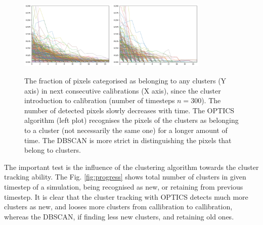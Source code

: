 \begin{figure}[H]
\centering
\includegraphics[width=0.4\textwidth]{figures/chapter4/velopix_clusters/optics_decay.png}
\includegraphics[width=0.4\textwidth]{figures/chapter4/velopix_clusters/dbscan_decay.png}
\caption{The fraction of pixels categorised as belonging to any clusters (Y axis) in next consecutive calibrations (X axis), since the cluster introduction to calibration (number of timesteps $n=300$). The number of detected pixels slowly decreases with time. The OPTICS algorithm (left plot) recognises the pixels of the clusters as belonging to a cluster (not necessarily the same one) for a longer amount of time. The DBSCAN is more strict in distinguishing the pixels that belong to clusters.
}
\label{fig:decay}
\end{figure}

The important test is the influence of the clustering algorithm towards the cluster tracking ability. The Fig. \ref{fig:progress} shows total number of clusters in given timestep of a simulation, being recognised as new, or retaining from previous timestep. It is clear that the cluster tracking with OPTICS detects much more clusters as new, and looses more clusters from callibration to callibration, whereas the DBSCAN, if finding less new clusters, and retaining old ones.

